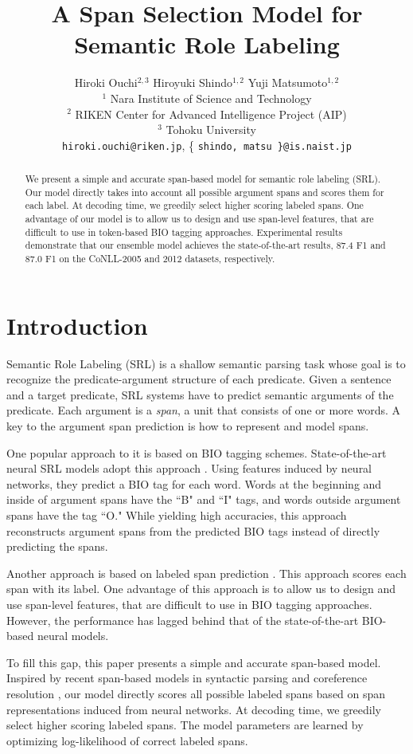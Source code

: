 \documentclass[11pt,a4paper]{article}
\title{A Span Selection Model for Semantic Role Labeling}
\author{Hiroki Ouchi$^{2,3}$ \hspace{0.7cm} Hiroyuki Shindo$^{1,2}$ \hspace{0.7cm} Yuji Matsumoto$^{1,2}$\\
  {$^1$ Nara Institute of Science and Technology}\\
  {$^2$ RIKEN Center for Advanced Intelligence Project (AIP)}\\
  {$^3$ Tohoku University}\\
  {\tt hiroki.ouchi@riken.jp}, \{ {\tt shindo, matsu \}@is.naist.jp}}
\date{}
\begin{document}
\maketitle
\begin{abstract}
We present a simple and accurate span-based model for semantic role labeling (SRL).
Our model directly takes into account all possible argument spans and scores them for each label.
At decoding time, we greedily select higher scoring labeled spans.
One advantage of our model is to allow us to design and use span-level features, that are difficult to use in token-based BIO tagging approaches.
Experimental results demonstrate that our ensemble model achieves the state-of-the-art results, 87.4 F1 and 87.0 F1 on the CoNLL-2005 and 2012 datasets, respectively.
\end{abstract}

\section{Introduction}
\label{sec:intro}
Semantic Role Labeling (SRL) is a shallow semantic parsing task whose goal is to recognize the predicate-argument structure of each predicate.
Given a sentence and a target predicate, SRL systems have to predict semantic arguments of the predicate.
Each argument is a {\it span}, a unit that consists of one or more words.
A key to the argument span prediction is how to represent and model spans.

One popular approach to it is based on BIO tagging schemes.
State-of-the-art neural SRL models adopt this approach \cite{zhou:15,he:17,tan:18}.
Using features induced by neural networks, they predict a BIO tag for each word.
Words at the beginning and inside of argument spans have the ``B" and ``I" tags, and words outside argument spans have the tag ``O."
While yielding high accuracies, this approach reconstructs argument spans from the predicted BIO tags instead of directly predicting the spans.

Another approach is based on labeled span prediction \cite{oscar:15,fitzgerald:15}.
This approach scores each span with its label.
One advantage of this approach is to allow us to design and use span-level features, that are difficult to use in BIO tagging approaches.
However, the performance has lagged behind that of the state-of-the-art BIO-based neural models.

To fill this gap, this paper presents a simple and accurate span-based model.
Inspired by recent span-based models in syntactic parsing and coreference resolution \cite{stern:17,lee:17},  our model directly scores all possible labeled spans based on span representations induced from neural networks.
At decoding time, we greedily select higher scoring labeled spans.
The model parameters are learned by optimizing log-likelihood of correct labeled spans.
\end{document}
